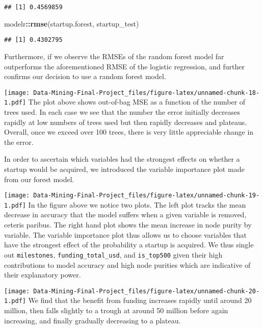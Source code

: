 \documentclass[
]{article}
\newenvironment{Shaded}{\begin{snugshade}}{\end{snugshade}}
\newcommand{\KeywordTok}[1]{\textcolor[rgb]{0.13,0.29,0.53}{\textbf{#1}}}
\newcommand{\NormalTok}[1]{#1}
\newcommand{\OperatorTok}[1]{\textcolor[rgb]{0.81,0.36,0.00}{\textbf{#1}}}
\begin{document}
\begin{verbatim}
## [1] 0.4569859
\end{verbatim}

\begin{Shaded}
\begin{Highlighting}[]
\NormalTok{modelr}\OperatorTok{::}\KeywordTok{rmse}\NormalTok{(startup.forest, startup_test)}
\end{Highlighting}
\end{Shaded}

\begin{verbatim}
## [1] 0.4302795
\end{verbatim}

Furthermore, if we observe the RMSEs of the random forest model far
outperforms the aforementioned RMSE of the logistic regression, and
further confirms our decision to use a random forest model.

\texttt{[image: Data-Mining-Final-Project\_files/figure-latex/unnamed-chunk-18-1.pdf]}
The plot above shows out-of-bag MSE as a function of the number of trees
used. In each case we see that the number the error initially decreases
rapidly at low numbers of trees used but then rapidly decreases and
plateaus. Overall, once we exceed over 100 trees, there is very little
appreciable change in the error.

In order to ascertain which variables had the strongest effects on
whether a startup would be acquired, we introduced the variable
importance plot made from our forest model.

\texttt{[image: Data-Mining-Final-Project\_files/figure-latex/unnamed-chunk-19-1.pdf]}
In the figure above we notice two plots. The left plot tracks the mean
decrease in accuracy that the model suffers when a given variable is
removed, ceteris paribus. The right hand plot shows the mean increase in
node purity by variable. The variable importance plot thus allows us to
choose variables that have the strongest effect of the probability a
startup is acquired. We thus single out \texttt{milestones},
\texttt{funding\_total\_usd}, and \texttt{is\_top500} given their high
contributions to model accuracy and high node purities which are
indicative of their explanatory power.

\texttt{[image: Data-Mining-Final-Project\_files/figure-latex/unnamed-chunk-20-1.pdf]}
We find that the benefit from funding increases rapidly until around 20
million, then falls slightly to a trough at around 50 million before
again increasing, and finally gradually decreasing to a plateau.
\end{document}
